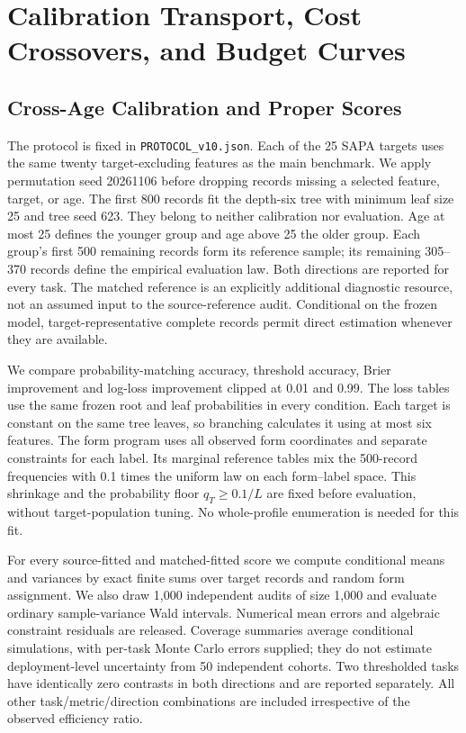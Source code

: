\section{Calibration Transport, Cost Crossovers, and Budget Curves}
\subsection{Cross-Age Calibration and Proper Scores}\label{app:transfer}
The protocol is fixed in \texttt{PROTOCOL\_v10.json}. Each of the 25 SAPA
targets uses the same twenty target-excluding features as the main
benchmark. We apply permutation seed 20261106 before dropping records
missing a selected feature, target, or age. The first 800 records fit the
depth-six tree with minimum leaf size 25 and tree seed 623. They belong
to neither calibration nor evaluation. Age at most 25 defines the younger
group and age above 25 the older group. Each group's first 500 remaining
records form its reference sample; its remaining 305--370 records define
the empirical evaluation law. Both directions are reported for every task.
The matched reference is an explicitly additional diagnostic resource,
not an assumed input to the source-reference audit. Conditional on the
frozen model, target-representative complete records permit direct
estimation whenever they are available.

We compare probability-matching accuracy, threshold accuracy, Brier
improvement and log-loss improvement clipped at 0.01 and 0.99. The loss
tables use the same frozen root and leaf probabilities in every condition.
Each target is constant on the same tree leaves, so branching calculates
it using at most six features. The form program uses all observed form
coordinates and separate constraints for each label. Its marginal
reference tables mix the 500-record frequencies with 0.1 times the uniform
law on each form--label space. This shrinkage and the probability floor
$q_T\ge0.1/L$ are fixed before evaluation, without target-population tuning.
No whole-profile enumeration is needed for this fit.

For every source-fitted and matched-fitted score we compute conditional
means and variances by exact finite sums over target records and random
form assignment. We also draw 1,000 independent audits of size 1,000 and
evaluate ordinary sample-variance Wald intervals. Numerical mean errors
and algebraic constraint residuals are released. Coverage summaries average
conditional simulations, with per-task Monte Carlo errors supplied; they
do not estimate deployment-level uncertainty from 50 independent cohorts.
Two thresholded tasks have identically zero contrasts in both directions
and are reported separately. All other task/metric/direction combinations
are included irrespective of the observed efficiency ratio.

